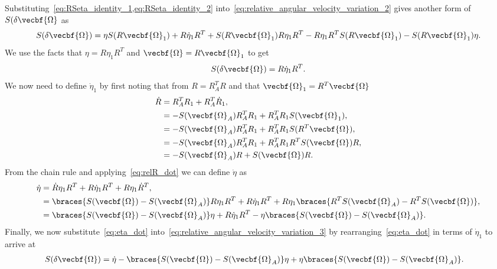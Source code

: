 \documentclass[11pt, reqno]{article}    %
\begin{document}
Substituting~\cref{eq:RSeta_identity_1,eq:RSeta_identity_2} into~\cref{eq:relative_angular_velocity_variation_2} gives another form of \( S(\delta \vecbf{\Omega}\) as
\begin{align}\label{eq:relative_angular_velocity_variation_3}
    S(\delta \vecbf{\Omega}) = \eta S(R \vecbf{\Omega}_1) + R \dot{\eta}_1 R^T + S(R \vecbf{\Omega}_1) R \eta_1 R^T - R \eta_1 R^T S(R \vecbf{\Omega}_1) - S(R \vecbf{\Omega}_1) \eta .
\end{align}
We use the facts that \( \eta = R \eta_1 R^T \) and \( \vecbf{\Omega} = R \vecbf{\Omega}_1\) to get
\begin{align}\label{eq:relative_angular_velocity_variation_3}
    S(\delta \vecbf{\Omega}) = R \dot{\eta}_1 R^T.
\end{align}
We now need to define \( \dot{\eta}_1\) by first noting that from \( R = R_A^T R\) and that \( \vecbf{\Omega}_1 = R^T \vecbf{\Omega}\)
\begin{align}\label{eq:relR_dot}
    \dot{R} &= R_A^T R_1 + R_A^T \dot{R}_1 , \nonumber\\
    &= - S(\vecbf{\Omega}_A) R_A^T R_1 + R_A^T R_1 S(\vecbf{\Omega}_1) ,\nonumber\\
    &= -S(\vecbf{\Omega}_A) R_A^T R_1 + R_A^T R_1 S(R^T \vecbf{\Omega}) , \nonumber\\
    &= -S(\vecbf{\Omega}_A)R_A^T R_1 + R_A^T R_1 R^T S(\vecbf{\Omega}) R ,\nonumber\\
    &= -S(\vecbf{\Omega}_A)R + S(\vecbf{\Omega}) R .
\end{align}
From the chain rule and applying~\cref{eq:relR_dot} we can define \( \dot{\eta} \) as
\begin{align}\label{eq:eta_dot}
    \dot{\eta} &= \dot{R} \eta_1 R^T + R \dot{\eta}_1 R^T + R \eta_1 \dot{R}^T , \nonumber\\
    &= \braces{S(\vecbf{\Omega}) - S(\vecbf{\Omega}_A)} R \eta_1 R^T + R \dot{\eta}_1 R^T + R \eta_1 \braces{R^T S(\vecbf{\Omega}_A) - R^T S(\vecbf{\Omega})} , \nonumber\\
    &= \braces{S(\vecbf{\Omega}) - S(\vecbf{\Omega}_A)} \eta + R \dot{\eta}_1 R^T - \eta \braces{S(\vecbf{\Omega}) - S(\vecbf{\Omega}_A)} .
\end{align}
Finally, we now substitute~\cref{eq:eta_dot} into~\cref{eq:relative_angular_velocity_variation_3} by rearranging~\cref{eq:eta_dot} in terms of \( \dot{\eta}_1\) to arrive at
\begin{align}\label{eq:rel_ang_vel_var}
    S(\delta \vecbf{\Omega}) &= \dot{\eta} - \braces{S(\vecbf{\Omega}) - S(\vecbf{\Omega}_A)} \eta + \eta \braces{S(\vecbf{\Omega}) - S(\vecbf{\Omega}_A)} .
\end{align}
\end{document}
